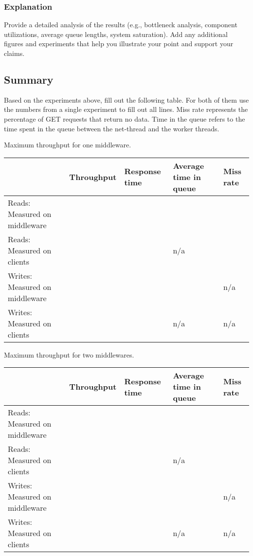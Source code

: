 \documentclass[11pt,a4paper]{article}
\begin{document}
\subsubsection{Explanation}

Provide a detailed analysis of the results (e.g., bottleneck analysis, component utilizations, average queue lengths, system saturation). Add any additional figures and experiments that help you illustrate your point and support your claims.

\subsection{Summary}

Based on the experiments above, fill out the following table. For both of them use the numbers from a single experiment to fill out all lines. Miss rate represents the percentage of GET requests that return no data. Time in the queue refers to the time spent in the queue between the net-thread and the worker threads.


\begin{center}
	{Maximum throughput for one middleware.}
	\begin{tabular}{|l|p{2cm}|p{2cm}|p{2cm}|p{2cm}|}
		\hline                                & Throughput & Response time & Average time in queue & Miss rate \\ 
		\hline Reads: Measured on middleware  &            &               &                       &           \\ 
		\hline Reads: Measured on clients     &            &               & n/a                   &           \\ 
		\hline Writes: Measured on middleware &            &               &                       & n/a       \\ 
		\hline Writes: Measured on clients    &            &               & n/a                   & n/a       \\ 
		\hline 
	\end{tabular}
\end{center}

\begin{center}
	{Maximum throughput for two middlewares.}
	\begin{tabular}{|l|p{2cm}|p{2cm}|p{2cm}|p{2cm}|}
		\hline                                & Throughput & Response time & Average time in queue & Miss rate \\ 
		\hline Reads: Measured on middleware  &            &               &                       &           \\ 
		\hline Reads: Measured on clients     &            &               & n/a                   &           \\ 
		\hline Writes: Measured on middleware &            &               &                       & n/a       \\ 
		\hline Writes: Measured on clients    &            &               & n/a                   & n/a       \\ 
		\hline 
	\end{tabular}
\end{center}
\end{document}
